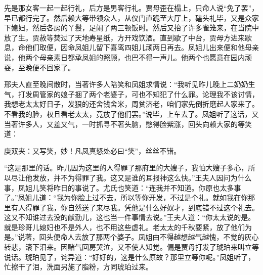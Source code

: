 \begin{parag}
    先是那女客一起一起行礼，后方是男客行礼。贾母歪在榻上，只命人说“免了罢”，早已都行完了。然后赖大等带领众人，从仪门直跪至大厅上，磕头礼毕，又是众家下媳妇，然后各房的丫鬟，足闹了两三顿饭时。然后又抬了许多雀笼来，在当院中放了生。贾赦等焚过了天地寿星纸，方开戏饮酒。直到歇了中台，贾母方进来歇息，命他们取便，因命凤姐儿留下喜鸾四姐儿顽两日再去。凤姐儿出来便和他母亲说，他两个母亲素日都承凤姐的照顾，也巴不得一声儿。他两个也愿意在园内顽耍，至晚便不回家了。
\end{parag}


\begin{parag}
    邢夫人直至晚间散时，当著许多人陪笑和凤姐求情说：“我听见昨儿晚上二奶奶生气，打发周管家的娘子捆了两个老婆子，可也不知犯了什么罪。论理我不该讨情，我想老太太好日子，发狠的还舍钱舍米，周贫济老，咱们家先倒折磨起人家来了。不看我的脸，权且看老太太，竟放了他们罢。”说毕，上车去了。凤姐听了这话，又当著许多人，又羞又气，一时抓寻不著头脑，憋得脸紫涨，回头向赖大家的等笑道：\begin{note}庚双夹：又写笑，妙！凡凤真怒处必曰“笑”，丝丝不错。\end{note}“这是那里的话。昨儿因为这里的人得罪了那府里的大嫂子，我怕大嫂子多心，所以尽让他发放，并不为得罪了我。这又是谁的耳报神这么快。”王夫人因问为什么事，凤姐儿笑将昨日的事说了。尤氏也笑道：“连我并不知道。你原也太多事了。”凤姐儿道：“我为你脸上过不去，所以等你开发，不过是个礼。就如我在你那里有人得罪了我，你自然送了来尽我。凭他是什么好奴才，到底错不过这个礼去。这又不知谁过去没的献勤儿，这也当一件事情去说。”王夫人道：“你太太说的是。就是珍哥儿媳妇也不是外人，也不用这些虚礼。老太太的千秋要紧，放了他们为是。”说著，回头便命人去放了那两个婆子。凤姐由不得越想越气越愧，不觉的灰心转悲，滚下泪来。因赌气回房哭泣，又不使人知觉。偏是贾母打发了琥珀来叫立等说话。琥珀见了，诧异道：“好好的，这是什么原故？那里立等你呢。”凤姐听了，忙擦干了泪，洗面另施了脂粉，方同琥珀过来。
\end{parag}



